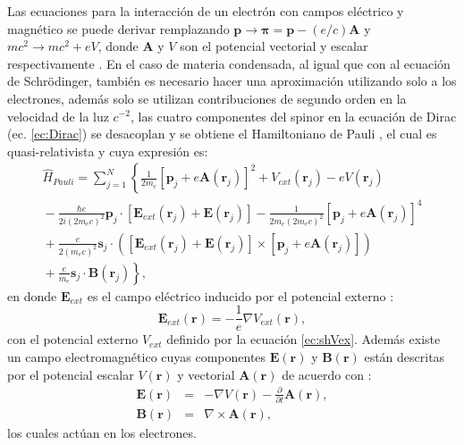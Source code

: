 Las ecuaciones para la interacci\'on de un electr\'on con campos el\'ectrico y magn\'etico se puede derivar remplazando $\pmb{p} \rightarrow \pmb{\pi} = \pmb{p}-(e/c) \pmb{A}$ y $m c^2 \rightarrow mc^2 + e V$,  donde $\pmb{A}$ y $V$ son el potencial vectorial y escalar respectivamente \cite{MB-2015}. En el caso de materia condensada, al igual que con al ecuaci\'on de Schr\"odinger, tambi\'en es necesario hacer una aproximaci\'on utilizando solo a los electrones, adem\'as solo se utilizan contribuciones de segundo orden en  la velocidad de la luz $c^{-2}$, las cuatro componentes del spinor en la ecuaci\'on de Dirac (ec. \ref{ec:Dirac}) se desacoplan y se obtiene el Hamiltoniano  de Pauli \cite{MB-2015, pauli_1927}, el cual es quasi-relativista y cuya expresi\'on es:
\begin{multline}
	\hat{H}_{Pauli} = \sum_{j=1}^{N} \left\{\frac{1}{2 m_e} [\pmb{p}_j + e \pmb{A} (\pmb{r}_j)]^2 + V_{ext} (\pmb{r}_j)- e V (\pmb{r}_j)\right.\\ \left. {} -\frac{\hbar e}{2 i  (2 m_e c)^2} \pmb{p}_j \cdot [\pmb{E}_{ext} (\pmb{r}_j) + \pmb{E} (\pmb{r}_j)] - \frac{1}{2 m_e (2 m_e c)^2} [\pmb{p}_j + e \pmb{A} (\pmb{r}_j)]^4 \right. \\
	\left. {} + \frac{e}{2 (m_e c)^2} \pmb{s}_j \cdot ([\pmb{E}_{ext} (\pmb{r}_j) + \pmb{E} (\pmb{r}_j)] \times [\pmb{p}_j + e \pmb{A} (\pmb{r}_j)]  ) \right. \\
	\left. {} + \frac{e}{m_e} \pmb{s}_j \cdot \pmb{B} (\pmb{r}_j) \right\} \label{ec:HamilDirac},
\end{multline}    
en donde $\pmb{E}_{ext}$ es el campo el\'ectrico inducido por el potencial externo \cite{PhysRev.78.29}:
\begin{equation}
	\pmb{E}_{ext} (\pmb{r}) = - \frac{1}{e} \nabla V_{ext} (\pmb{r}) \label{ec:Eext},
\end{equation}
con el potencial externo $V_{ext}$ definido por la ecuaci\'on \ref{ec:shVex}. Adem\'as existe un campo electromagn\'etico cuyas componentes $\pmb{E} (\pmb{r})$ y $\pmb{B} (\pmb{r})$ est\'an descritas por el potencial escalar $V(\pmb{r})$ y  vectorial $\pmb{A} (\pmb{r})$ de acuerdo con \cite{PhysRev.78.29}:
\begin{eqnarray}
	\pmb{E} (\pmb{r}) &=& - \nabla V(\pmb{r}) - \frac{\partial}{\partial t} \pmb{A} (\pmb{r}), \nonumber \\
	\pmb{B} (\pmb{r}) &=& \nabla \times \pmb{A} (\pmb{r}) \label{ec:camposElectromageticos},
\end{eqnarray}
los cuales act\'uan en los electrones.
\newline
